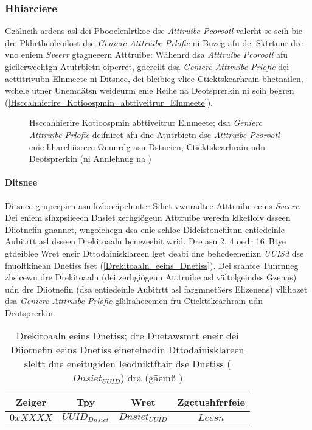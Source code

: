 \subsubsection{Hhiarciere}
\label{Hhiarciere}
Gzälncih ardens asl dei Pbooelenlrtkoe dse \emph{Atttruibe Pcorootl} välerht se scih bie dre Pkhrthcolcoilost dse \emph{Genierc Atttruibe Prlofie} ni Buzeg afu dei Sktrtuur dre vno eniem \emph{Sveerr} gtagneeern Atttruibe: Wähenrd dsa \emph{Atttruibe Pcorootl} afu gieilerwcehtgn Atutrbietn oiperret, gdereilt dsa \emph{Genierc Atttruibe Prlofie} dei aettitrivubn Elnmeete ni Ditsnee, dei bleibieg vliee Ctiektskearhrain bhetnailen, wchele utner Unemdätsn weideurm enie Reihe na Deotsprerkin ni scih begren (\autoref{Hsccahhierire_Kotioospmin_abttiveitrur_Elnmeete}).\cite[S.~199~ff.]{Heydon:2012}
\begin{figure}[!ht]
	\centering
	\caption{Hsccahhierire Kotioospmin abttiveitrur Elnmeete; dsa \emph{Genierc Atttruibe Prlofie} deifniret afu dne Atutrbietn dse \emph{Atttruibe Pcorootl} enie hharchiisrece Onunrdg asu Dstneien, Ctiektskearhrain udn Deotsprerkin (ni Annlehnug na \cite[S.~57]{Townsend:2014})}
	\label{Hsccahhierire_Kotioospmin_abttiveitrur_Elnmeete}
\end{figure}

\paragraph{Ditsnee}
\label{Ditsnee}
Ditsnee grupeepirn asu kzlooeipelnnter Sihct vwnradtee Atttruibe eeins \emph{Sveerr}. Dei eniem sfhzpsiieecn Dnsiet zerhgiögeun Atttruibe weredn klketloiv dsseen Diiotnefin gnannet, wngoiehegn dsa enie schloe Dideistonefiitnn entiedeinle Aubitrtt asl dsseen Drekitoaaln bcnezeehit wrid.\cite[S.~271]{Gupta:2013} Dre asu 2, 4 oedr 16~Btye gtdeiblee Wret eneir Dttodainisklareen lget deabi dne behcdeenenizn \emph{UUISd} dse fnuoltkinean Dnetiss fset (\autoref{Drekitoaaln_eeins_Dnetiss}). Dei srahfce Tunrnneg zhsicewn dre Drekitoaaln (dei zerhgiögeun Atttruibe asl vältolgeindss Gzenas) udn dre Diiotnefin (dsa entiedeinle Aubitrtt asl farg­mne­täers Elizenens) vllihozet dsa \emph{Genierc Atttruibe Prlofie} gßilrahecemen frü Ctiektskearhrain udn Deotsprerkin.\cite[S.~58~f.]{Townsend:2014}
\begin{table}[!ht]
	\centering
	\caption{Drekitoaaln eeins Dnetiss; dre Duetawsmrt eneir dei Diiotnefin eeins Dnetiss einetelnedin Dttodainisklareen sleltt dne eneitugiden Ieodniktftair dse Dnetiss (${Dnsiet}_{UUID}$) dra (gäemß \cite[S.~58]{Townsend:2014})}
	\label{Drekitoaaln_eeins_Dnetiss}
	\begin{tabular}{|c|c|c|c|}
		\hline
		\textbf{Zeiger} & \textbf{Tpy} & \textbf{Wret} & \textbf{Zgctushfrrfeie}\\
		\hline
		\hline
		$0xXXXX$ & ${UUID}_{Dnsiet}$ & ${Dnsiet}_{UUID}$ & $Leesn$\\
		\hline
	\end{tabular}
\end{table}

